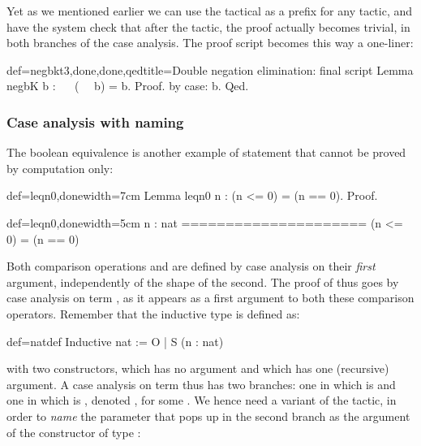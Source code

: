 Yet as we mentioned earlier we can use the  tactical as a
prefix for any tactic, and have the system check that after the
 tactic, the proof actually becomes trivial, in both branches
of the case analysis. The proof script becomes this way a one-liner:

\begin{coq}{def=negbkt3,done,done,qed}{title=Double negation elimination: final script}
Lemma negbK b : ~~ (~~ b) = b.
Proof. by case: b. Qed.
\end{coq}

\subsubsection{Case analysis with naming}

The boolean equivalence  is another example of statement that
cannot be proved by computation only:

\begin{coq}{def=leqn0,done}{width=7cm}
Lemma leqn0 n : (n <= 0) = (n == 0).
Proof.
\end{coq}
\begin{coqout}{def=leqn0,done}{width=5cm}
n : nat
=====================
  (n <= 0) = (n == 0)
\end{coqout}

Both comparison operations \C{<=} and \C{==} are defined by case
analysis on their \emph{first} argument, independently of the shape of
the second. The proof of  thus goes by case analysis on
 term , as it appears as a first argument to
both these comparison operators.  Remember that the inductive type  is
defined as:

\begin{coq}{def=natdef}{}
Inductive nat := O | S (n : nat)
\end{coq}
with two constructors,  which has no argument and  which has
one (recursive) argument. A case analysis on term  thus
has two branches: one in which  is  and one in which  is
, denoted , for some . We hence need a
variant of the  tactic, in order to \emph{name} the parameter
 that pops up in the second branch as the argument of the 
constructor of type :

